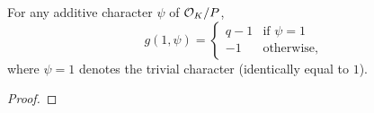 \begin{lemma}
  \label{lem:gaussSum_one_left}
  \leanok
  For any additive character $\psi$ of $\mathcal{O}_K/P$,
  \[
    g(1, \psi) = \begin{cases} q - 1 & \text{if } \psi = 1 \\ -1 & \text{otherwise,} \end{cases}
  \]
  where $\psi = 1$ denotes the trivial character (identically equal to $1$).
\end{lemma}

\begin{proof}
\leanok
\end{proof}
